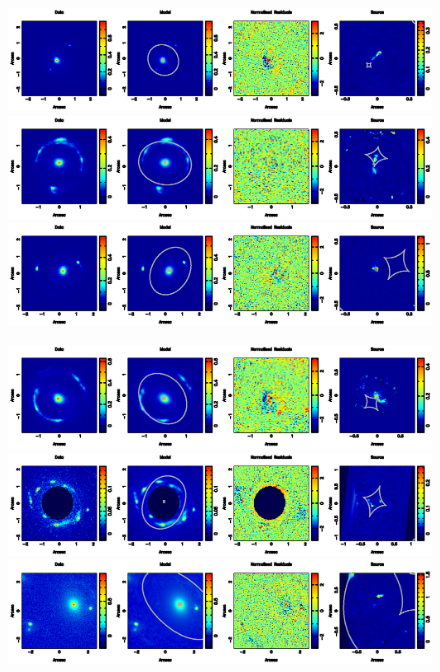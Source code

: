 \documentclass[a4paper,fleqn,usenatbib]{mnras}
\begin{document}
  \begin{figure}
\begin{center} 
\includegraphics[width = 16 cm]{fig4a.ps}
\includegraphics[width = 16 cm]{fig4b.ps}
\includegraphics[width = 16 cm]{fig4c.ps}
\contcaption{}
\end{center}     
 \end{figure}
 
 \begin{figure}
\begin{center} 
\includegraphics[width = 16 cm]{fig5a.ps}
\includegraphics[width = 16 cm]{fig5b.ps}
\includegraphics[width = 16 cm]{fig5c.ps}
\contcaption{}
\end{center}     
 \end{figure}
 
\end{document}
